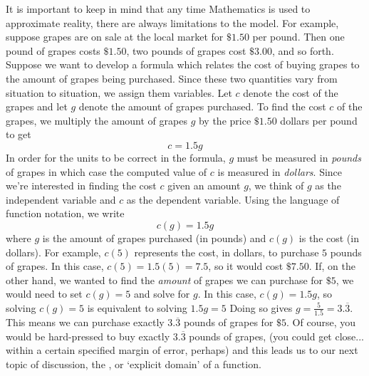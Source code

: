 \medskip

It is important to keep in mind that any time Mathematics is used to approximate reality, there are always limitations to the model.  For example, suppose grapes are on sale at the local market for $\$1.50$ per pound. Then one pound of grapes costs $\$1.50$, two pounds of grapes cost $\$3.00$, and so forth.  Suppose we want to develop a formula which relates the cost of buying grapes to the amount of grapes being purchased.  Since these two quantities vary from situation to situation, we assign them variables.  Let $c$ denote the cost of the grapes and let $g$ denote the amount of grapes purchased. To find the cost $c$ of the grapes, we multiply the amount of grapes $g$ by the price $\$1.50$ dollars per pound to get \[c = 1.5 g\]  In order for the units to be correct in the formula, $g$ must be measured in \textit{pounds} of grapes in which case the computed value of $c$ is measured in \textit{dollars}.  Since we're interested in finding the cost $c$ given an amount $g$, we think of $g$ as the independent variable and $c$ as the dependent variable.  Using the language of function notation, we write \[c(g) = 1.5 g\] where $g$ is the amount of grapes purchased (in pounds) and $c(g)$ is the cost (in dollars).  For example, $c(5)$ represents the cost, in dollars, to purchase $5$ pounds of grapes. In this case, $c(5) = 1.5(5) = 7.5$, so it would cost $\$ 7.50$. If, on the other hand, we wanted to find the \textit{amount} of grapes we can purchase for $\$5$, we would need to set $c(g) = 5$ and solve for $g$.  In this case, $c(g)=1.5g$, so solving  $c(g) = 5$ is equivalent to solving $1.5g = 5$  Doing so gives $g = \frac{5}{1.5} = 3.\overline{3}$. This means we can purchase exactly $3.\overline{3}$ pounds of grapes for $\$5$.  Of course, you would be hard-pressed to buy exactly $3.\overline{3}$ pounds of grapes, (you could get close...  within a certain specified margin of error, perhaps) and this leads us to our next topic of discussion, the , or `explicit domain' of a function.

\medskip

